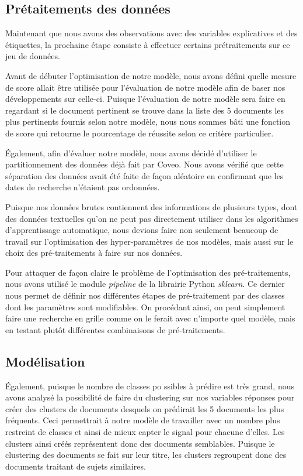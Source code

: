 \subsection{Prétaitements des données}

Maintenant que nous avons des observations avec des variables explicatives et des étiquettes, la prochaine étape consiste à effectuer certains prétraitements sur ce jeu de données.

Avant de débuter l'optimisation de notre modèle, nous avons défini quelle mesure de score allait être utilisée pour l'évaluation de notre modèle afin de baser nos développements sur celle-ci.
Puisque l'évaluation de notre modèle sera faire en regardant si le document pertinent se trouve dans la liste des 5 documents les plus pertinents fournis selon notre modèle, nous nous sommes bâti une fonction de score qui retourne le pourcentage de réussite selon ce critère particulier.

Également, afin d'évaluer notre modèle, nous avons décidé d'utiliser le partitionnement des données déjà fait par Coveo. Nous avons vérifié que cette séparation des données avait été faite de façon aléatoire en confirmant que les dates de recherche n'étaient pas ordonnées.

Puisque nos données brutes contiennent des informations de plusieurs types, dont des données textuelles qu'on ne peut pas directement utiliser dans les algorithmes d'apprentissage automatique, nous devions faire non seulement beaucoup de travail sur l'optimisation des hyper-paramètres de nos modèles, mais aussi sur le choix des pré-traitements à faire sur nos données.

Pour attaquer de façon claire le problème de l'optimisation des pré-traitements, nous avons utilisé le module \emph{pipeline} de la librairie Python \emph{sklearn}.
Ce dernier nous permet de définir nos différentes étapes de pré-traitement par des classes dont les paramètres sont modifiables.
On procédant ainsi, on peut simplement faire une recherche en grille comme on le ferait avec n'importe quel modèle, mais en testant plutôt différentes combinaisons de pré-traitements.

\subsection{Modélisation}

Également, puisque le nombre de classes po  ssibles à prédire est très grand, nous avons analysé la possibilité de faire du clustering sur nos variables réponses pour créer des clusters de documents desquels on prédirait les 5 documents les plus fréquents. Ceci permettrait à notre modèle de travailler avec un nombre plus restreint de classes et ainsi de mieux capter le signal pour chacune d'elles.
Les clusters ainsi créés représentent donc des documents semblables.
Puisque le clustering des documents se fait sur leur titre, les clusters regroupent donc des documents traitant de sujets similaires.

